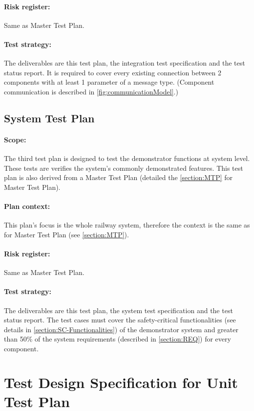 \paragraph{Risk register:} Same as Master Test Plan.
\paragraph{Test strategy:} The deliverables are this test plan, the integration test specification and the test status report. It is required to cover every existing connection between 2 components with at least 1 parameter of a message type. (Component communication is described in \autoref{fig:communicationModel}.)

\subsection{System Test Plan}\label{ssection:STP}
\paragraph{Scope:} The third test plan is designed to test the demonstrator functions at system level. These tests are verifies the system's commonly demonstrated features. This test plan is also derived from a Master Test Plan (detailed the \autoref{section:MTP} for Master Test Plan). 
\paragraph{Plan context:} This plan's focus is the whole railway system, therefore the context is the same as for Master Test Plan (see \autoref{section:MTP}).
\paragraph{Risk register:} Same as Master Test Plan.
\paragraph{Test strategy:} The deliverables are this test plan, the system test specification and the test status report. The test cases must cover the safety-critical functionalities (see details in \autoref{section:SC-Functionalities}) of the demonstrator system and greater than 50\% of the system requirements (described in \autoref{section:REQ}) for every component.

\section{Test Design Specification for Unit Test Plan}

